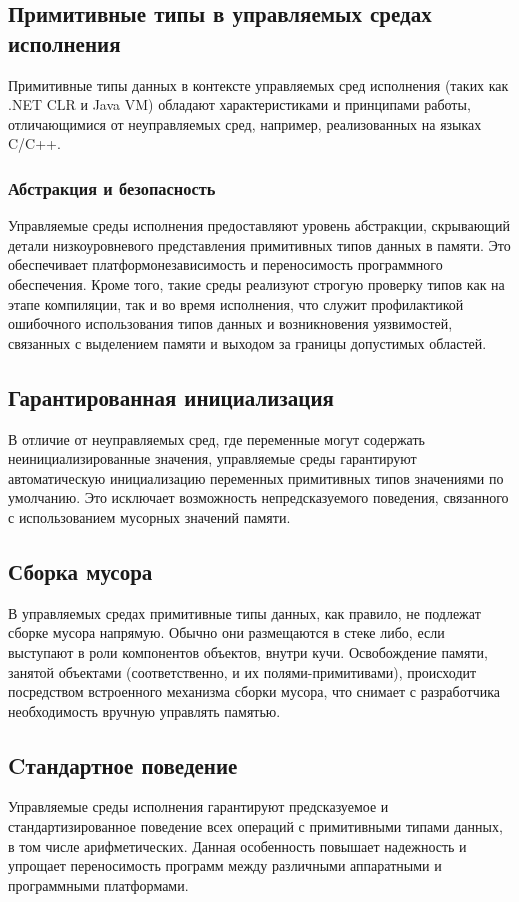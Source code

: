 \subsection{Примитивные типы в управляемых средах исполнения}

Примитивные типы данных в контексте управляемых сред исполнения (таких как .NET CLR и Java VM) обладают характеристиками и принципами работы,
отличающимися от неуправляемых сред, например, реализованных на языках C/C++.


\subsubsection*{Абстракция и безопасность}
Управляемые среды исполнения предоставляют уровень абстракции, скрывающий детали низкоуровневого представления примитивных типов данных в памяти. Это обеспечивает платформонезависимость и переносимость программного обеспечения.
Кроме того, такие среды реализуют строгую проверку типов как на этапе компиляции, так и во время исполнения, что служит профилактикой ошибочного использования типов данных и возникновения уязвимостей, связанных с выделением памяти и выходом за границы допустимых областей.

\subsection*{Гарантированная инициализация}
В отличие от неуправляемых сред, где переменные могут содержать неинициализированные значения, управляемые среды гарантируют автоматическую инициализацию переменных
примитивных типов значениями по умолчанию. Это исключает возможность непредсказуемого поведения, связанного с использованием мусорных значений памяти.

\subsection*{Сборка мусора}
В управляемых средах примитивные типы данных, как правило, не подлежат сборке мусора напрямую. Обычно они размещаются в стеке либо, если выступают в роли компонентов объектов, внутри кучи. Освобождение памяти, занятой объектами (соответственно, и их полями-примитивами),
происходит посредством встроенного механизма сборки мусора, что снимает с разработчика необходимость вручную управлять памятью.

\subsection*{Cтандартное поведение}
Управляемые среды исполнения гарантируют предсказуемое и стандартизированное поведение всех операций с примитивными типами данных, в том числе арифметических.
Данная особенность повышает надежность и упрощает переносимость программ между различными аппаратными и программными платформами.

